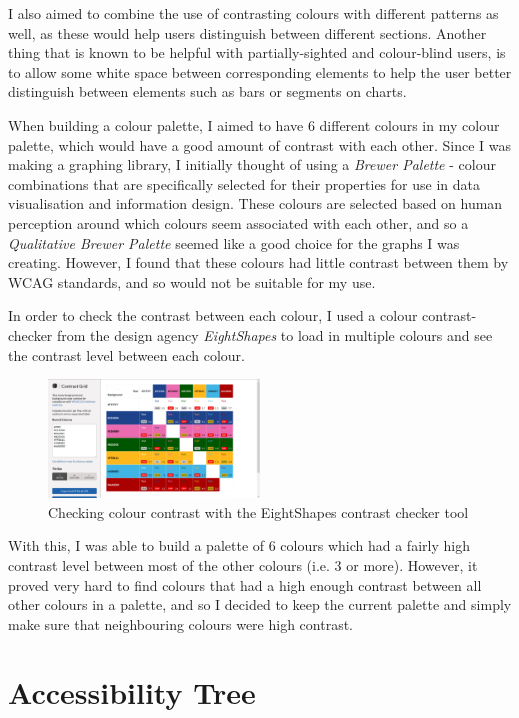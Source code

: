 \documentclass[ %
                    author={Aleena Baig},
                supervisor={Dr Simon Lock},
                    degree={BSc},
                     title={On Making Web Accessible Graphs},
                  subtitle={},
                      year={2019} ]{dissertation}
\begin{document}
I also aimed to combine the use of contrasting colours with different patterns as well, as these would help users distinguish between different sections. Another thing that is known to be helpful with partially-sighted and colour-blind users, is to allow some white space between corresponding elements to help the user better distinguish between elements such as bars or segments on charts.

When building a colour palette, I aimed to have 6 different colours in my colour palette, which would have a good amount of contrast with each other. Since I was making a graphing library, I initially thought of using a \textit{Brewer Palette} - colour combinations that are specifically selected for their properties for use in data visualisation and information design. These colours are selected based on human perception around which colours seem associated with each other, and so a \textit{Qualitative Brewer Palette} seemed like a good choice for the graphs I was creating. However, I found that these colours had little contrast between them by WCAG standards, and so would not be suitable for my use.

In order to check the contrast between each colour, I used a colour contrast-checker from the design agency \textit{EightShapes} to load in multiple colours and see the contrast level between each colour.

\begin{figure}[h]
\caption{Checking colour contrast with the EightShapes contrast checker tool}
\centering
\includegraphics[width=0.5\textwidth]{images/EightShapeColourChecker.png}
\end{figure}

With this, I was able to build a palette of 6 colours which had a fairly high contrast level between most of the other colours (i.e. 3 or more). However, it proved very hard to find colours that had a high enough contrast between all other colours in a palette, and so I decided to keep the current palette and simply make sure that neighbouring colours were high contrast.

\section{Accessibility Tree}
\end{document}
